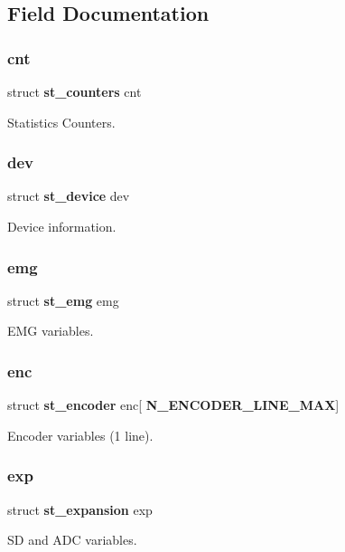 \subsection{Field Documentation}
\mbox{\label{structst__eeprom_a0ffc8a85c87e768e5f0f4682ad738f47}} 
\subsubsection{cnt}
{\footnotesize\ttfamily struct \textbf{ st\+\_\+counters} cnt}

Statistics Counters. \mbox{\label{structst__eeprom_a0d9bfa887343b9469fc02391208359ff}} 
\subsubsection{dev}
{\footnotesize\ttfamily struct \textbf{ st\+\_\+device} dev}

Device information. \mbox{\label{structst__eeprom_a423333afbc7d0ab697d1f8e12ef8271f}} 
\subsubsection{emg}
{\footnotesize\ttfamily struct \textbf{ st\+\_\+emg} emg}

E\+MG variables. \mbox{\label{structst__eeprom_aa275bd5d24411d272636769852d7ccdc}} 
\subsubsection{enc}
{\footnotesize\ttfamily struct \textbf{ st\+\_\+encoder} enc[\textbf{ N\+\_\+\+E\+N\+C\+O\+D\+E\+R\+\_\+\+L\+I\+N\+E\+\_\+\+M\+AX}]}

Encoder variables (1 line). \mbox{\label{structst__eeprom_a928bf130fc931f6623a2ae15be1f7b18}} 
\subsubsection{exp}
{\footnotesize\ttfamily struct \textbf{ st\+\_\+expansion} exp}

SD and A\+DC variables. \mbox{\label{structst__eeprom_a8917eae058a1a8c4d46b82e467cd0888}} 
